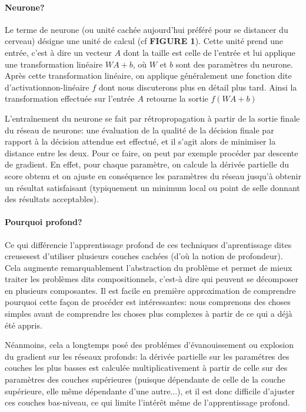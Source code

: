 \documentclass[a4paper, 11pt, onecolumn]{article}
\begin{document}
\paragraph{Neurone?}

Le terme de neurone (ou unité cachée aujourd'hui préféré pour se distancer du
cerveau) désigne une unité de calcul (cf \textbf{FIGURE 1}). Cette unité prend
une entrée, c'est à dire un vecteur $A$ dont la taille est celle de l'entrée et lui
applique une transformation linéaire $WA + b$, où $W$ et $b$ sont des paramètres
du neurone. Après cette transformation linéaire, on applique généralement une
fonction dite \og d'activation\fg non-linéaire $f$ dont nous discuterons plus en
détail plus tard. Ainsi la transformation effectuée sur l'entrée $A$ retourne la
sortie $f(WA + b)$

L'entraînement du neurone se fait par rétropropagation à partir de la sortie
finale du réseau de neurone: une évaluation de la qualité de la décision finale
par rapport à la décision attendue est effectué, et il
s'agit alors de minimiser la distance entre les deux. Pour ce
faire, on peut par exemple procéder par descente de gradient. En effet, pour
chaque paramètre, on calcule la dérivée partielle du score obtenu et on ajuste en
conséquence les paramètres du réseau jusqu'à obtenir un résultat satisfaisant
(typiquement un minimum local ou point de selle donnant des résultats acceptables).

\paragraph{Pourquoi profond?}

Ce qui différencie l'apprentissage profond de ces techniques d'aprentissage dites \og
creuses\fg est d'utiliser plusieurs couches cachées (d'où la notion de
profondeur). Cela augmente remarquablement l'abstraction du problème et permet
de mieux traiter les problèmes dits compositionnels, c'est-à dire qui peuvent se
décomposer en plusieurs composantes. Il est facile en première approximation de
comprendre pourquoi cette façon de procéder est intéressantes: nous comprenons
des choses simples avant de comprendre les choses plus complexes à partir de ce
qui a déjà été appris.

Néanmoins, cela a longtemps posé des problémes d'évanouissement ou explosion du gradient sur les
réseaux profonds: la dérivée partielle sur les paramétres des couches les plus
basses est calculée multiplicativement à partir de celle sur des paramètres des
couches supérieures (puisque dépendante de celle de la couche
supérieure, elle même dépendante d'une autre...), et il est donc difficile d'ajuster ces couches
bas-niveau, ce qui limite l'intérêt même de l'apprentissage profond.
\end{document}
